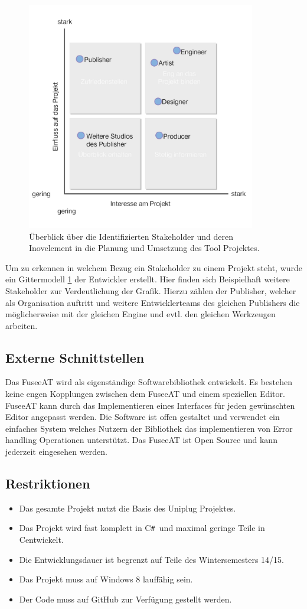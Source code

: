 \documentclass[pagesize, paper=a4, fontsize=12pt, titlepage=true, headings=small, headnosepline, abstractoff, liststotoc, nochapterprefix, plainheadsepline, twoside]{scrreprt}
\newcommand{\CSS}{C\texttt{\# }}
\newcommand{\CPP}{C\nolinebreak\hspace{-.05em}\raisebox{.4ex}{\tiny\bf +}\nolinebreak\hspace{-.10em}\raisebox{.4ex}{\tiny\bf +}}
\begin{document}
\begin{figure}[ht]
	\centering
	\includegraphics[width=10cm]{Bilder/Stakeholder_Diagramm.jpg}
	\caption{Überblick über die Identifizierten Stakeholder und deren Inovelement in die Planung und Umsetzung des Tool Projektes.}
	\label{StakeholderGrafik}
\end{figure}
Um zu erkennen in welchem Bezug ein Stakeholder zu einem Projekt steht, wurde ein Gittermodell \ref{StakeholderGrafik} der Entwickler erstellt. Hier finden sich Beispielhaft weitere Stakeholder zur Verdeutlichung der Grafik. Hierzu zählen der Publisher, welcher als Organisation auftritt und weitere Entwicklerteams des gleichen Publishers die möglicherweise mit der gleichen Engine und evtl. den gleichen Werkzeugen arbeiten.

\subsection{Externe Schnittstellen}
Das FuseeAT wird als eigenständige Softwarebibliothek entwickelt. Es bestehen keine engen Kopplungen zwischen dem FuseeAT und einem speziellen Editor. FuseeAT kann durch das Implementieren eines Interfaces für jeden gewünschten Editor angepasst werden. Die Software ist offen gestaltet und verwendet ein einfaches System welches Nutzern der Bibliothek das implementieren von Error handling Operationen unterstützt. Das FuseeAT ist Open Source und kann jederzeit eingesehen werden.

\subsection{Restriktionen}
\begin{itemize}
\item Das gesamte Projekt nutzt die Basis des Uniplug Projektes.
\item Das Projekt wird fast komplett in \CSS und maximal geringe Teile in \CPP entwickelt.
\item Die Entwicklungsdauer ist begrenzt auf Teile des Wintersemesters 14/15.
\item Das Projekt muss auf Windows 8 lauffähig sein.
\item Der Code muss auf GitHub zur Verfügung gestellt werden.
\end{itemize}
\end{document}
